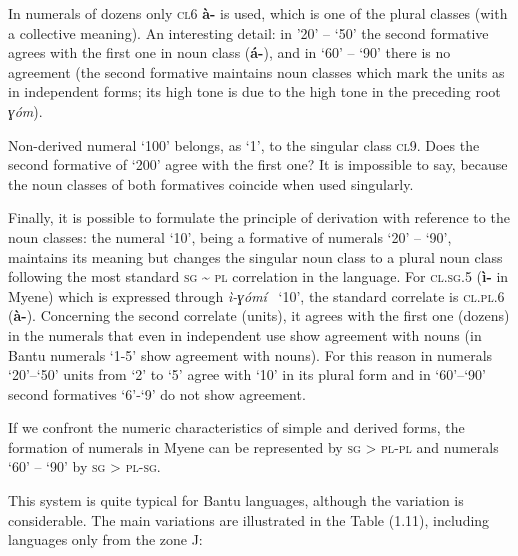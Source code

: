 In numerals of dozens only \textsc{cl}6 \textbf{à-}  is used, which is one of the plural classes (with a collective meaning). An interesting detail: in ’20’ – ‘50’ the second formative agrees with the first one in noun class  (\textbf{á-}), and in ‘60’ – ‘90’ there is no agreement (the second formative maintains noun classes which mark the units as in independent forms; its high tone is due to the high tone in the preceding root \textit{ɣ{\'{o}}m}). 

Non-derived numeral ‘100’ belongs, as ‘1’, to the singular class \textsc{cl}9. Does the second formative of ‘200’ agree with the first one? It is impossible to say, because the noun classes of both formatives coincide when used singularly. 

Finally, it is possible to formulate the principle of derivation with reference to the noun classes: the numeral ‘10’, being a formative of numerals ‘20’ – ‘90’, maintains its meaning but changes the singular noun class to a plural noun class following the most standard \textsc{sg} {\textasciitilde} \textsc{pl} correlation in the language. For \textsc{cl}.\textsc{sg}.5 (\textbf{ì-} in Myene) which is expressed through \textit{ì-}\textit{ɣ{\'{o}}mí} ~‘10’, the standard correlate is \textsc{cl}.\textsc{pl}.6 (\textbf{{\`{a}}-}). Concerning the second correlate (units), it agrees with the first one (dozens) in the numerals that even in independent use show agreement with nouns (in Bantu numerals ‘1-5’ show agreement with nouns). For this reason in numerals ‘20’–‘50’ units from ‘2’ to ‘5’ agree with ‘10’ in its plural form and in ‘60’–‘90’ second formatives ‘6’-‘9’ do not show agreement. 

If we confront the numeric characteristics of simple and derived forms, the formation of numerals in Myene can be represented by \textsc{sg} > \textsc{pl}-\textsc{pl} and numerals ‘60’ – ‘90’ by \textsc{sg} > \textsc{pl}-\textsc{sg}.

This system is quite typical for Bantu languages, although the variation is considerable. The main variations are illustrated in the Table (1.11), including languages only from the zone J: 

